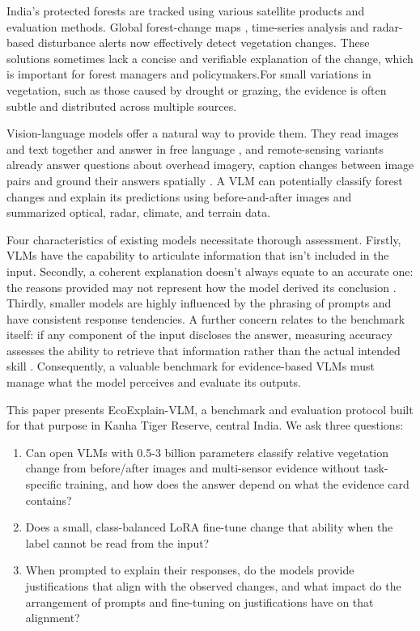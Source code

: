 \documentclass[11pt]{article}
\begin{document}
India's protected forests are tracked using various satellite products and evaluation methods. 
Global forest-change maps \citep{hansen2013}, time-series analysis and radar-based disturbance alerts now effectively detect vegetation changes. 
These solutions sometimes lack a concise and verifiable explanation of the change, which is important for forest managers and policymakers.For small variations in vegetation, such as those caused by drought or grazing, the evidence is often subtle and distributed across multiple sources.

Vision-language models offer a natural way to provide them. They read
images and text together and answer in free language \citep{wang2024qwen2vl,li2024interleave}, and remote-sensing variants already
answer questions about overhead imagery, caption
changes between image pairs and ground their
answers spatially \citep{kuckreja2024}. A VLM can potentially classify forest changes and explain its predictions using before-and-after images and summarized optical, radar, climate, and terrain data.


Four characteristics of existing models necessitate thorough assessment. 
Firstly, VLMs have the capability to articulate information that isn’t included in the input. 
Secondly, a coherent explanation doesn’t always equate to an accurate one: the reasons provided may not represent how the model derived its conclusion \citep{jacovi2020}.
Thirdly, smaller models are highly influenced by the phrasing of prompts and have consistent response tendencies. 
 A further concern relates to the benchmark itself: if any component of the input discloses the answer, measuring accuracy assesses the ability to retrieve that information rather than the actual intended skill \citep{kaufman2012}.
Consequently, a valuable benchmark for evidence-based VLMs must manage what the model perceives and evaluate its outputs.

This paper presents EcoExplain-VLM, a benchmark and evaluation protocol
built for that purpose in Kanha Tiger Reserve, central India. We ask
three questions:
\begin{enumerate}
\item Can open VLMs with 0.5-3 billion parameters classify relative
vegetation change from before/after images and multi-sensor evidence
without task-specific training, and how does the answer depend on what
the evidence card contains?
\item Does a small, class-balanced LoRA fine-tune \citep{hu2022lora}
change that ability when the label cannot be read from the input?
\item When prompted to explain their responses, do the models provide justifications that align with the observed changes, and what impact do the arrangement of prompts and fine-tuning on justifications have on that alignment?
\end{enumerate}
\end{document}
